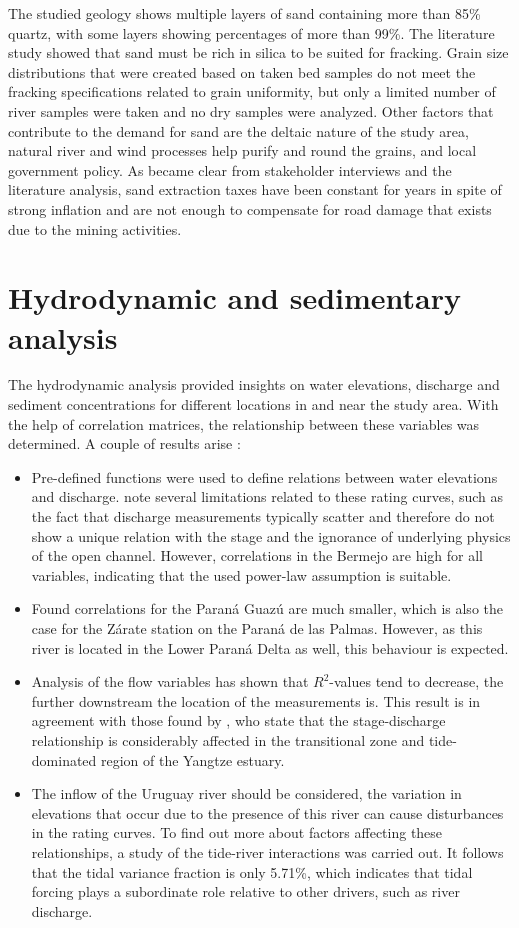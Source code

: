 The studied geology shows multiple layers of sand containing more than 85\% quartz, with some layers showing percentages of more than 99\%. The literature study showed that sand must be rich in silica to be suited for fracking. Grain size distributions that were created based on taken bed samples do not meet the fracking specifications related to grain uniformity, but only a limited number of river samples were taken and no dry samples were analyzed. Other factors that contribute to the demand for sand are the deltaic nature of the study area, natural river and wind processes help purify and round the grains, and local government policy. As became clear from stakeholder interviews and the literature analysis, sand extraction taxes have been constant for years in spite of strong inflation and are not enough to compensate for road damage that exists due to the mining activities.

\section{Hydrodynamic and sedimentary analysis}
The hydrodynamic analysis provided insights on water elevations, discharge and sediment concentrations for different locations in and near the study area. With the help of correlation matrices, the relationship between these variables was determined. A couple of results arise
:
\begin{itemize}
    \item Pre-defined functions were used to define relations between water elevations and discharge. \textcite{schmidtStageDischargeRelationshipOpen2011} note several limitations related to these rating curves, such as the fact that discharge measurements typically scatter and therefore do not show a unique relation with the stage and the ignorance of underlying physics of the open channel. However, correlations in the Bermejo are high for all variables, indicating that the used power-law assumption is suitable.
    \item Found correlations for the Paraná Guazú are much smaller, which is also the case for the Zárate station on the Paraná de las Palmas. However, as this river is located in the Lower Paraná Delta as well, this behaviour is expected.
    \item Analysis of the flow variables has shown that $R^2$-values tend to decrease, the further downstream the location of the measurements is. This result is in agreement with those found by \textcite{songEvaluatingUnderstandingTideriver2024}, who state that the stage-discharge relationship is considerably affected in the transitional zone and tide-dominated region of the Yangtze estuary. 
    \item The inflow of the Uruguay river should be considered, the variation in elevations that occur due to the presence of this river can cause disturbances in the rating curves. To find out more about factors affecting these relationships, a study of the tide-river interactions was carried out. It follows that the tidal variance fraction is only 5.71\%, which indicates that tidal forcing plays a subordinate role relative to other drivers, such as river discharge. 
\end{itemize}

